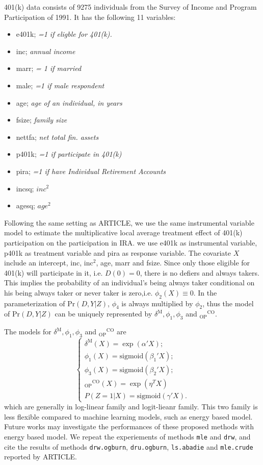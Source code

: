 \documentclass{article}
\begin{document}
401(k) data consists of 9275 individuals from the Survey of Income and Program Participation of 1991. It has the following 11 variables:
\begin{itemize}
  \item  e401k; {\it =1 if eligble for 401(k).}
  \item inc;  {\it annual income}
  \item marr;  {\it = 1 if married}
  \item male; {\it=1 if male respondent }
  \item age; {\it age of an individual, in years}
  \item fsize; {\it family size  }
  \item nettfa; {\it net total fin. assets}
  \item p401k; {\it =1 if participate in 401(k) }
  \item pira; {\it =1 if have Individual Retirement Accounts }
 \item incsq;  {\it $inc^2$}
 \item agesq;  {\it $age^2$}
\end{itemize}


Following the same setting as ARTICLE, we use the same instrumental variable model to estimate the multiplicative local average treatment effect of 401(k) participation on the participation in IRA. we use e401k as instrumental variable, p401k as treatment variable and pira as response variable. The covariate $X$ include an intercept, inc, $\mathrm{inc}^2$, age, marr and fsize. 
Since only those eligible for 401(k) will participate in it, i.e. $D(0) = 0$, there is no defiers and always takers. This implies the probability of an individual's being always taker conditional on his being always taker or never taker is zero,i.e. $\phi_2(X) \equiv 0$. In the parameterization of $\mathrm{Pr}(D, Y| Z)$, $\phi_4$ is always multiplied by $\phi_2$, thus the model of $\mathrm{Pr}(D, Y| Z)$ can be uniquely represented by $\delta^\mathrm{M}, \phi_1, \phi_3$ and ${ }_{\mathrm{OP}}{ }^{\mathrm{CO}}$.

The models for $\delta^\mathrm{M}, \phi_1, \phi_3$ and ${ }_{\mathrm{OP}}{ }^{\mathrm{CO}}$  are
\begin{equation}
\left\{
\begin{array}{l}
\delta^{\mathrm{M}}(X) = \exp(\alpha' X);\\
\phi_1(X) = \mathrm{sigmoid}(\beta_1' X);\\
\phi_3(X) = \mathrm{sigmoid}(\beta_2' X);\\
{ }_{\mathrm{OP}}{ }^{\mathrm{CO}}(X) = \exp(\eta^T X)\\
P(Z=1|X) = \mathrm{sigmoid}(\gamma' X).
\end{array}
\right.
\end{equation}
which are generally in log-linear family and logit-lieanr family. This two family is less flexible compared to machine learning models, such as energy based model. Future works may investigate the performances of these proposed methods with energy based model. We repeat the experiements of methods \texttt{mle} and \texttt{drw}, and cite the results of methods  \texttt{drw.ogburn},  \texttt{dru.ogburn},  \texttt{ls.abadie} and  \texttt{mle.crude} reported by ARTICLE.
\end{document}
